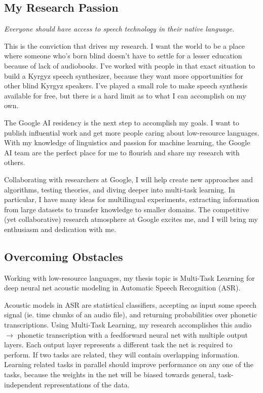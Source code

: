 \documentclass[12pt,a4paper]{article}
\begin{document}
\subsection*{My Research Passion}

\begin{center}
\textit{Everyone should have access to speech technology in their native language.}
\end{center}

This is the conviction that drives my research. I want the world to be a place where someone who's born blind doesn't have to settle for a lesser education because of lack of audiobooks. I've worked with people in that exact situation to build a Kyrgyz speech synthesizer, because they want more opportunities for other blind Kyrgyz speakers. I've played a small role to make speech synthesis available for free, but there is a hard limit as to what I can accomplish on my own.

The Google AI residency is the next step to accomplish my goals. I want to publish influential work and get more people caring about low-resource languages. With my knowledge of linguistics and passion for machine learning, the Google AI team are the perfect place for me to flourish and share my research with others.

Collaborating with researchers at Google, I will help create new approaches and algorithms, testing theories, and diving deeper into multi-task learning. In particular, I have many ideas for multilingual experiments, extracting information from large datasets to transfer knowledge to smaller domains. The competitive (yet collaborative) research atmosphere at Google excites me, and I will bring my enthusiasm and dedication with me. 


\subsection*{Overcoming Obstacles}

Working with low-resource languages, my thesis topic is Multi-Task Learning for deep neural net acoustic modeling in Automatic Speech Recognition (ASR).

Acoustic models in ASR are statistical classifiers, accepting as input some speech signal (ie. time chunks of an audio file), and returning probabilities over phonetic transcriptions. Using Multi-Task Learning, my research accomplishes this audio $\rightarrow$ phonetic transcription with a feedforward neural net with multiple output layers. Each output layer represents a different task the net is required to perform. If two tasks are related, they will contain overlapping information. Learning related tasks in parallel should improve performance on any one of the tasks, because the weights in the net will be biased towards general, task-independent representations of the data.
\end{document}
